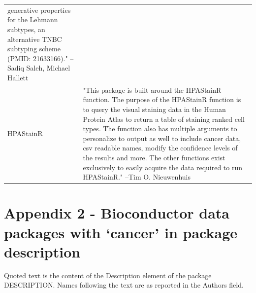 \begin{longtable}[t]{l>{\raggedright\arraybackslash}p{25em}}
generative properties for the Lehmann subtypes, an alternative
TNBC subtyping scheme (PMID: 21633166)." --Sadiq Saleh, Michael Hallett\\
HPAStainR & "This package is built around the HPAStainR function. The
purpose of the HPAStainR function is to query the visual
staining data in the Human Protein Atlas to return a table of
staining ranked cell types. The function also has multiple
arguments to personalize to output as well to include cancer
data, csv readable names, modify the confidence levels of the
results and more. The other functions exist exclusively to
easily acquire the data required to run HPAStainR." --Tim O. Nieuwenhuis\\
\bottomrule
\end{longtable}

\newpage

\hypertarget{app2}{%
\section{Appendix 2 - Bioconductor data packages with `cancer' in package description}\label{app2}}

Quoted text is the content of the Description element of the package DESCRIPTION. Names following the
text are as reported in the Authors field.


